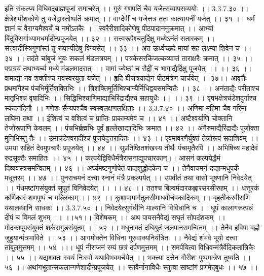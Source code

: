 इति संकल्प्य विधिवद्ब्राह्मपूजां समाचरेत् ।।
गुरुं गणपतिं चैव यजेत्सव्यापसव्ययोः ।। 3.3.7.३० ।।
क्षेत्रेशमीशकोणे तु यजेद्वास्तोष्पतिं क्रमात् ।।
वाग्देवीं च यजेत्तत्र ततः कात्यायनीं यजेत् ।। ३१ ।।
धर्मं ज्ञानं च वैराग्यमैश्वर्यं च नमोंऽतकैः ।।
स्वरैरीशादिकोणेषु पीठपादाननुक्रमात् ।।
आभ्यां बिंदुविसर्गाभ्यामधर्मादीन्प्रपूजयेत् ।। ३२ ।।
सत्त्वरूपैश्चतुर्दिक्षु मध्येऽनंतं सतारकम् ।।
सत्त्वादींस्त्रिगुणांस्तं तु रूपान्पीठेषु विन्यसेत् ।। ३३ ।।
अत ऊर्ध्वच्छदे मायां सह लक्ष्म्या शिवेन च ।। ३४ ।।
तदंते चांबुजं भूयः सकलं मंडलत्रयम् ।।
पत्रकेसरकिंजल्कव्याप्तं ताराक्षरैः क्रमात् ।। ३५ ।।
पद्मत्रयं तथाभ्यर्च्य मध्ये मंडलमादरात् ।।
वामां ज्येष्ठां च रौद्रीं च भागाद्यैर्दिक्षु पूजयेत् ।। ।। ३६ ।।
वामाद्या नव शक्तीश्च नवस्वरयुता यजेत् ।।
हृदि बीजत्रयाद्येन पीठमंत्रेण चार्चयेत् ।।३७।।
आवृत्तैः प्रथमांगैश्च पंचभिर्मूर्तिशक्तिभिः ।।
त्रिशक्तिमूर्तिभिश्चान्यैर्निधिद्वयसमन्वितैः ।। ३८ ।।
अनंताद्यैः परीताश्च मातृभिश्च वृषादिभिः ।।
सिद्धिभिश्चाणिमाद्याभिरिंद्राद्यैश्च सहायुधैः ।। ।। ३९ ।।
वृषभक्षेत्रचंडेशदुर्गाश्च स्कंदनंदिनौ ।।
गणेशः सैन्यपश्चैव स्वस्वलक्षणलक्षिताः ।। 3.3.7.४० ।।
अणिमा महिमा चैव गरिमा लघिमा तथा ।।
ईशित्वं च वशित्वं च प्राप्तिः प्राकाम्यमेव च ।। ४१ ।।
अष्टैश्वर्याणि चोक्तानि तेजोरूपाणि केवलम् ।।
पंचभिर्ब्रह्मभिः पूर्वं हृल्लेखाद्यादिभिः क्रमात ।। ४२ ।।
अंगैरुमाद्यैरिंद्राद्यैः पूजोक्ता मुनिभिस्तु तैः ।।
उमाचंडेश्वरादींश्च पूजयेदुत्तरादितः ।। ४३ ।।
एवमावरणैर्युक्तं तेजोरूपं सदाशिवम् ।।
उमया सहितं देवमुपचारैः प्रपूजयेत् ।। ४४ ।।
सुप्रतिष्ठितशंखस्य तीर्थैः पंचामृतैरपि ।।
अभिषिच्य महादेवं रुद्रसूक्तैः समाहितः ।। ४५ ।।
कल्पयेद्विविधैर्मंत्रैरासनाद्युपचारकान्।।
आसनं कल्पयेद्धैमं दिव्यवस्त्रसमन्वितम् ।। ४६ ।।
अर्घ्यमष्टगुणोपेतं पाद्यशुद्धोदकेन च ।।
तेनैवाचमनं दद्यान्मधुपर्कं मधूत्तरम् ।। ४७ ।।
पुनराचमनं दत्त्वा स्नानं मंत्रै प्रकल्पयेत् ।।
उपवीतं तथा वासो भूषणानि निवेदयेत् ।।
गंधमष्टांगसंयुक्तं सुपूतं विनिवेदयेत् ।। ।। ४८ ।।
ततश्च बिल्वमंदारकह्लारसरसीरुहम् ।।
धत्तूरकं कर्णिकारं शणपुष्पं च मल्लिकाम् ।। ४९ ।।
कुशापामार्गतुलसीमाधवीचंपकादिकम् ।।
बृहतीकरवीराणि यथालब्धानि साधकः ।। 3.3.7.५० ।।
निवेदयेत्सुगंधीनि माल्यानि विविधानि च ।।
धूपं कालागरूत्पन्नं दीपं च विमलं शुभम् ।। ।।५१।।
विशेषकम् ।।
अथ पायसनैवेद्यं सघृतं सोपदंशकम् ।।
मोदकापूपसंयुक्तं शर्करागुडसंयुतम् ।। ५२ ।।
मधुनाक्तं दधियुतं जलपानसमन्वितम् ।।
तेनैव हविषा वह्नौ जुहुयान्मंत्रभाविते ।। ५३ ।।
आगमोक्तेन विधिना गुरुवाक्यनियंत्रितः ।।
नैवेद्यं शंभवे भूयो दत्त्वा तांबूलमुत्तमम् ।। ५४ ।।।
धूपं नीराजनं रम्यं छत्रं दर्पणमुत्तमम् ।।
समर्पयित्वा विधिवन्मंत्रैर्वेदिकतांत्रिकैः ।। ५५ ।।
यद्यशक्तः स्वयं निःस्वो यथाविभवमर्चयेत् ।।
भक्त्त्या दत्तेन गौरीशः पुष्पमात्रेण तुष्यति ।। ५६ ।।
अथांगभूतान्सकलान्गणेशादीन्प्रपूजयेत् ।।
स्तवैर्नानाविधैः स्तुत्वा साष्टांगं प्रणमेद्बुधः ।। ५७ ।।
